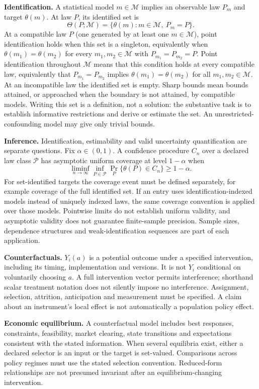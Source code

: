 \documentclass[11pt,a4paper]{article}
\begin{document}
\textbf{Identification.} A statistical model $m\in\mathcal M$ implies an observable law $P_m$ and target $\theta(m)$. At law $P$, its identified set is
\[
\Theta(P;\mathcal M)=\{\theta(m):m\in\mathcal M,\ P_m=P\}.
\]
At a compatible law $P$ (one generated by at least one $m\in\mathcal M$), point identification holds when this set is a singleton, equivalently when $\theta(m_1)=\theta(m_2)$ for every $m_1,m_2\in\mathcal M$ with $P_{m_1}=P_{m_2}=P$. Point identification throughout $\mathcal M$ means that this condition holds at every compatible law, equivalently that $P_{m_1}=P_{m_2}$ implies $\theta(m_1)=\theta(m_2)$ for all $m_1,m_2\in\mathcal M$. At an incompatible law the identified set is empty. Sharp bounds mean bounds attained, or approached when the boundary is not attained, by compatible models. Writing this set is a definition, not a solution: the substantive task is to establish informative restrictions and derive or estimate the set. An unrestricted-confounding model may give only trivial bounds.

\textbf{Inference.} Identification, estimability and valid uncertainty quantification are separate questions. Fix $\alpha\in(0,1)$. A confidence procedure $C_n$ over a declared law class $\mathcal P$ has asymptotic uniform coverage at level $1-\alpha$ when
\[
\liminf_{n\to\infty}\inf_{P\in\mathcal P}\Pr_P\{\theta(P)\in C_n\}\geq1-\alpha.
\]
For set-identified targets the coverage event must be defined separately, for example coverage of the full identified set. If an entry uses identification-indexed models instead of uniquely indexed laws, the same coverage convention is applied over those models. Pointwise limits do not establish uniform validity, and asymptotic validity does not guarantee finite-sample precision. Sample sizes, dependence structures and weak-identification sequences are part of each application.

\textbf{Counterfactuals.} $Y_i(a)$ is a potential outcome under a specified intervention, including its timing, implementation and versions. It is not $Y_i$ conditional on voluntarily choosing $a$. A full intervention vector permits interference; shorthand scalar treatment notation does not silently impose no interference. Assignment, selection, attrition, anticipation and measurement must be specified. A claim about an instrument's local effect is not automatically a population policy effect.

\textbf{Economic equilibrium.} A counterfactual model includes best responses, constraints, feasibility, market clearing, state transitions and expectations consistent with the stated information. When several equilibria exist, either a declared selector is an input or the target is set-valued. Comparisons across policy regimes must use the stated selection convention. Reduced-form relationships are not presumed invariant after an equilibrium-changing intervention.
\end{document}
